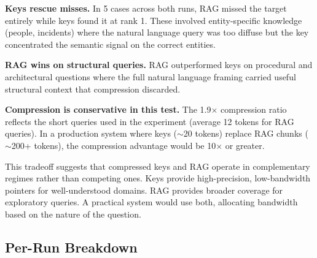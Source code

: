 \documentclass{article}
\begin{document}
\textbf{Keys rescue misses.} In 5 cases across both runs, RAG missed the target entirely while keys found it at rank 1. These involved entity-specific knowledge (people, incidents) where the natural language query was too diffuse but the key concentrated the semantic signal on the correct entities.

\textbf{RAG wins on structural queries.} RAG outperformed keys on procedural and architectural questions where the full natural language framing carried useful structural context that compression discarded.

\textbf{Compression is conservative in this test.} The 1.9$\times$ compression ratio reflects the short queries used in the experiment (average 12 tokens for RAG queries). In a production system where keys ($\sim$20 tokens) replace RAG chunks ($\sim$200+ tokens), the compression advantage would be 10$\times$ or greater.

This tradeoff suggests that compressed keys and RAG operate in complementary regimes rather than competing ones. Keys provide high-precision, low-bandwidth pointers for well-understood domains. RAG provides broader coverage for exploratory queries. A practical system would use both, allocating bandwidth based on the nature of the question.

\subsection{Per-Run Breakdown}
\end{document}

